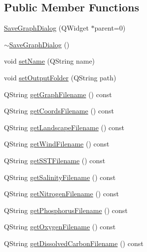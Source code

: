 \subsection*{Public Member Functions}
\begin{DoxyCompactItemize}
\item 
\mbox{\hyperlink{class_save_graph_dialog_ad9c38de73776a3870cdc6bc6bd9c0c6b}{Save\+Graph\+Dialog}} (Q\+Widget $\ast$parent=0)
\item 
\mbox{\hyperlink{class_save_graph_dialog_a8de40a8e64f15ad6427683920df65fd3}{$\sim$\+Save\+Graph\+Dialog}} ()
\item 
void \mbox{\hyperlink{class_save_graph_dialog_a4cdb6c4a898716a427727d571c94cbdc}{set\+Name}} (Q\+String name)
\item 
void \mbox{\hyperlink{class_save_graph_dialog_a3636a45047e51b5a9d42cf7af479e375}{set\+Output\+Folder}} (Q\+String path)
\item 
Q\+String \mbox{\hyperlink{class_save_graph_dialog_a65d2fb9a6407e8b0f161eabe92ef8155}{get\+Graph\+Filename}} () const
\item 
Q\+String \mbox{\hyperlink{class_save_graph_dialog_a6ee8fa4a7185a91647d670f699ee010a}{get\+Coords\+Filename}} () const
\item 
Q\+String \mbox{\hyperlink{class_save_graph_dialog_ac5a49db241c620c795b0e555fb0bee20}{get\+Landscape\+Filename}} () const
\item 
Q\+String \mbox{\hyperlink{class_save_graph_dialog_ac17696e67e946f8f56e5e97d5c7fb052}{get\+Wind\+Filename}} () const
\item 
Q\+String \mbox{\hyperlink{class_save_graph_dialog_a1990a77e16dff49d245bbf31b59580c5}{get\+S\+S\+T\+Filename}} () const
\item 
Q\+String \mbox{\hyperlink{class_save_graph_dialog_af918b728fc74d5e9cea206bf25d38399}{get\+Salinity\+Filename}} () const
\item 
Q\+String \mbox{\hyperlink{class_save_graph_dialog_a282eb2e8fcde41615702f88f22a5877a}{get\+Nitrogen\+Filename}} () const
\item 
Q\+String \mbox{\hyperlink{class_save_graph_dialog_ae989c632ffd5335ef6cdce0cb9dc25fb}{get\+Phosphorus\+Filename}} () const
\item 
Q\+String \mbox{\hyperlink{class_save_graph_dialog_a62d4e86590269c298ae6e54204e2e1d8}{get\+Oxygen\+Filename}} () const
\item 
Q\+String \mbox{\hyperlink{class_save_graph_dialog_aa6be5bf72cd23c8c21074d8fafdf26dd}{get\+Dissolved\+Carbon\+Filename}} () const
\item 

\end{DoxyCompactItemize}
